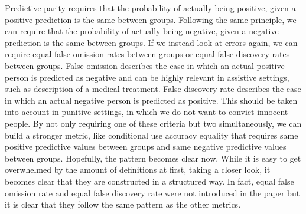 Predictive parity requires that the probability of actually being positive, given a positive prediction is the same between groups. Following the same principle, we can require that the probability of actually being negative, given a negative prediction is the same between groups. If we instead look at errors again, we can require equal false omission rates between groups or equal false discovery rates between groups. False omission describes the case in which an actual positive person is predicted as negative and can be highly relevant in assistive settings, such as description of a medical treatment. False discovery rate describes the case in which an actual negative person is predicted as positive. This should be taken into account in punitive settings, in which we do not want to convict innocent people. By not only requiring one of these criteria but two simultaneously, we can build a stronger metric, like conditional use accuracy equality that requires same positive predictive values between groups and same negative predictive values between groups.
Hopefully, the pattern becomes clear now. While it is easy to get overwhelmed by the amount of definitions at first, taking a closer look, it becomes clear that they are constructed in a structured way. In fact, equal false omission rate and equal false discovery rate were not introduced in the paper \cite{verma2018} but it is clear that they follow the same pattern as the other metrics.

